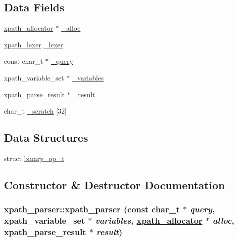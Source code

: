\subsection*{Data Fields}
\begin{CompactItemize}
\item 
\hyperlink{classxpath__allocator}{xpath\_\-allocator} $\ast$ \hyperlink{structxpath__parser_c34f5b21ef406bec944286eee2f45836}{\_\-alloc}
\item 
\hyperlink{classxpath__lexer}{xpath\_\-lexer} \hyperlink{structxpath__parser_50106db584946e67acd080ef5391a0f4}{\_\-lexer}
\item 
const char\_\-t $\ast$ \hyperlink{structxpath__parser_af5ea5d5be97cdd93adc7a719d8edc1c}{\_\-query}
\item 
xpath\_\-variable\_\-set $\ast$ \hyperlink{structxpath__parser_3e0adfea7cc81c08b97ee1375831df6c}{\_\-variables}
\item 
xpath\_\-parse\_\-result $\ast$ \hyperlink{structxpath__parser_9370fb875bfc49ca6e35f3165ecb1692}{\_\-result}
\item 
char\_\-t \hyperlink{structxpath__parser_a9180a17c8ec28977928c815c3425a79}{\_\-scratch} \mbox{[}32\mbox{]}
\end{CompactItemize}
\subsection*{Data Structures}
\begin{CompactItemize}
\item 
struct \hyperlink{structxpath__parser_1_1binary__op__t}{binary\_\-op\_\-t}
\end{CompactItemize}


\subsection{Constructor \& Destructor Documentation}
\hypertarget{structxpath__parser_3f5b4a04f4d0a0a44962d9825a86ed0d}{
\subsubsection[xpath\_\-parser]{\setlength{\rightskip}{0pt plus 5cm}xpath\_\-parser::xpath\_\-parser (const char\_\-t $\ast$ {\em query}, xpath\_\-variable\_\-set $\ast$ {\em variables}, \hyperlink{classxpath__allocator}{xpath\_\-allocator} $\ast$ {\em alloc}, xpath\_\-parse\_\-result $\ast$ {\em result})}}
\label{structxpath__parser_3f5b4a04f4d0a0a44962d9825a86ed0d}




